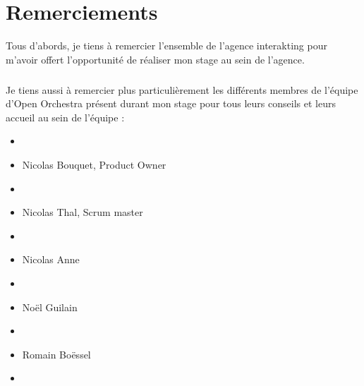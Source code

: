 \chapter*{Remerciements}
Tous d'abords, je tiens à remercier l'ensemble de l'agence interakting pour m'avoir offert l'opportunité de réaliser mon stage au sein de l'agence.
\paragraph{}
Je tiens aussi à remercier plus particulièrement les différents membres de l'équipe d'Open Orchestra présent durant mon stage pour tous leurs conseils et leurs accueil au sein de l'équipe : 

\begin{itemize}
\item[]
\item Nicolas Bouquet, Product Owner
\item[]
\item Nicolas Thal, Scrum master
\item[]
\item Nicolas Anne 
\item[]
\item Noël Guilain
\item[]
\item Romain Boëssel
\item[]
\end{itemize}